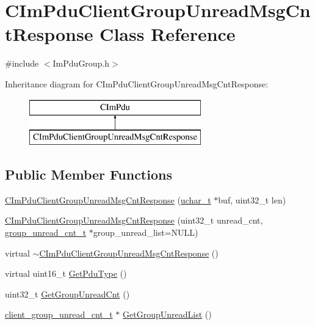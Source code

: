 \hypertarget{class_c_im_pdu_client_group_unread_msg_cnt_response}{}\section{C\+Im\+Pdu\+Client\+Group\+Unread\+Msg\+Cnt\+Response Class Reference}
\label{class_c_im_pdu_client_group_unread_msg_cnt_response}


{\ttfamily \#include $<$Im\+Pdu\+Group.\+h$>$}

Inheritance diagram for C\+Im\+Pdu\+Client\+Group\+Unread\+Msg\+Cnt\+Response\+:\begin{figure}[H]
\begin{center}
\leavevmode
\includegraphics[height=2.000000cm]{class_c_im_pdu_client_group_unread_msg_cnt_response}
\end{center}
\end{figure}
\subsection*{Public Member Functions}
\begin{DoxyCompactItemize}
\item 
\hyperlink{class_c_im_pdu_client_group_unread_msg_cnt_response_ae437891f94a6220435df77680cf3cb4f}{C\+Im\+Pdu\+Client\+Group\+Unread\+Msg\+Cnt\+Response} (\hyperlink{base_2ostype_8h_a124ea0f8f4a23a0a286b5582137f0b8d}{uchar\+\_\+t} $\ast$buf, uint32\+\_\+t len)
\item 
\hyperlink{class_c_im_pdu_client_group_unread_msg_cnt_response_aebcb7de7499f53b69ee56c1c726f1af4}{C\+Im\+Pdu\+Client\+Group\+Unread\+Msg\+Cnt\+Response} (uint32\+\_\+t unread\+\_\+cnt, \hyperlink{structgroup__unread__cnt__t}{group\+\_\+unread\+\_\+cnt\+\_\+t} $\ast$group\+\_\+unread\+\_\+list=N\+U\+L\+L)
\item 
virtual \hyperlink{class_c_im_pdu_client_group_unread_msg_cnt_response_a9ce3aee8a64cc53fad19e21dd01b24b8}{$\sim$\+C\+Im\+Pdu\+Client\+Group\+Unread\+Msg\+Cnt\+Response} ()
\item 
virtual uint16\+\_\+t \hyperlink{class_c_im_pdu_client_group_unread_msg_cnt_response_aa3e335a5225971885c7af41b98a55f7b}{Get\+Pdu\+Type} ()
\item 
uint32\+\_\+t \hyperlink{class_c_im_pdu_client_group_unread_msg_cnt_response_a34e79edea2373c989a7514b8738afd15}{Get\+Group\+Unread\+Cnt} ()
\item 
\hyperlink{structclient__group__unread__cnt__t}{client\+\_\+group\+\_\+unread\+\_\+cnt\+\_\+t} $\ast$ \hyperlink{class_c_im_pdu_client_group_unread_msg_cnt_response_a8dfc8fe1c03b249b051b4aeeaeef5186}{Get\+Group\+Unread\+List} ()
\end{DoxyCompactItemize}
